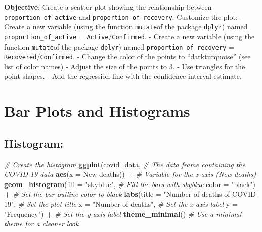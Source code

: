 \documentclass[
]{book}
\newenvironment{Shaded}{\begin{snugshade}}{\end{snugshade}}
\newcommand{\AttributeTok}[1]{\textcolor[rgb]{0.13,0.29,0.53}{#1}}
\newcommand{\CommentTok}[1]{\textcolor[rgb]{0.56,0.35,0.01}{\textit{#1}}}
\newcommand{\FunctionTok}[1]{\textcolor[rgb]{0.13,0.29,0.53}{\textbf{#1}}}
\newcommand{\NormalTok}[1]{#1}
\newcommand{\SpecialCharTok}[1]{\textcolor[rgb]{0.81,0.36,0.00}{\textbf{#1}}}
\newcommand{\StringTok}[1]{\textcolor[rgb]{0.31,0.60,0.02}{#1}}
\begin{document}
\textbf{Objective}: Create a scatter plot showing the relationship between \texttt{proportion\_of\_active} and \texttt{proportion\_of\_recovery}. Customize the plot:
- Create a new variable (using the function \texttt{mutate}of the package \texttt{dplyr}) named \texttt{proportion\_of\_active} = \texttt{Active}/\texttt{Confirmed}.
- Create a new variable (using the function \texttt{mutate}of the package \texttt{dplyr}) named \texttt{proportion\_of\_recovery} = \texttt{Recovered}/\texttt{Confirmed}.
- Change the color of the points to ``darkturquoise'' \href{https://sape.inf.usi.ch/quick-reference/ggplot2/colour}{(see list of color names)}
- Adjust the size of the points to 3.
- Use triangles for the point shapes.
- Add the regression line with the confidence interval estimate.

\section{Bar Plots and Histograms}\label{bar-plots-and-histograms}

\subsection{Histogram:}\label{histogram}

\begin{Shaded}
\begin{Highlighting}[]
\CommentTok{\# Create the histogram}
\FunctionTok{ggplot}\NormalTok{(covid\_data, }\CommentTok{\# The data frame containing the COVID{-}19 data}
       \FunctionTok{aes}\NormalTok{(}\AttributeTok{x =} \StringTok{\textasciigrave{}}\AttributeTok{New deaths}\StringTok{\textasciigrave{}}\NormalTok{)) }\SpecialCharTok{+} \CommentTok{\# Variable for the x{-}axis (New deaths)}
  \FunctionTok{geom\_histogram}\NormalTok{(}\AttributeTok{fill =} \StringTok{"skyblue"}\NormalTok{, }\CommentTok{\# Fill the bars with skyblue}
                 \AttributeTok{color =} \StringTok{"black"}\NormalTok{) }\SpecialCharTok{+} \CommentTok{\# Set the bar outline color to black}
  \FunctionTok{labs}\NormalTok{(}\AttributeTok{title =} \StringTok{"Number of deaths of COVID{-}19"}\NormalTok{, }\CommentTok{\# Set the plot title}
       \AttributeTok{x =} \StringTok{"Number of deaths"}\NormalTok{, }\CommentTok{\# Set the x{-}axis label}
       \AttributeTok{y =} \StringTok{"Frequency"}\NormalTok{) }\SpecialCharTok{+} \CommentTok{\# Set the y{-}axis label}
  \FunctionTok{theme\_minimal}\NormalTok{() }\CommentTok{\# Use a minimal theme for a cleaner look}
\end{Highlighting}
\end{Shaded}
\end{document}
